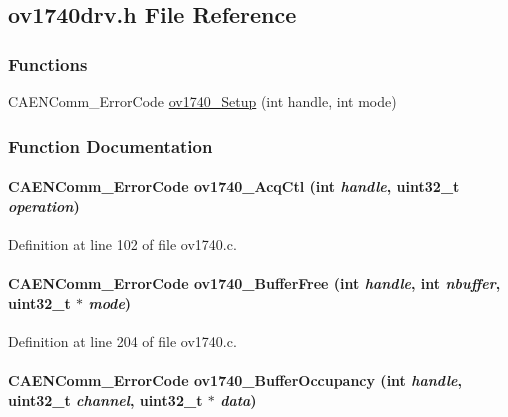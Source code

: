 \subsection{ov1740drv.h File Reference}
\label{ov1740drv_8h}
\subsubsection*{Functions}
\begin{DoxyCompactItemize}
\item 
CAENComm\_\-ErrorCode \hyperlink{ov1740drv_8h_a37458e8b4bbc712076b0b1e15c5241e9}{ov1740\_\-Setup} (int handle, int mode)
\end{DoxyCompactItemize}


\subsubsection{Function Documentation}
\paragraph[{ov1740\_\-AcqCtl}]{\setlength{\rightskip}{0pt plus 5cm}CAENComm\_\-ErrorCode ov1740\_\-AcqCtl (int {\em handle}, \/  uint32\_\-t {\em operation})}\hfill\label{ov1740drv_8h_a9f50f40f2578ebea2eff57a82a172ac8}


Definition at line 102 of file ov1740.c.
\paragraph[{ov1740\_\-BufferFree}]{\setlength{\rightskip}{0pt plus 5cm}CAENComm\_\-ErrorCode ov1740\_\-BufferFree (int {\em handle}, \/  int {\em nbuffer}, \/  uint32\_\-t $\ast$ {\em mode})}\hfill\label{ov1740drv_8h_a82abc70f4cc7d36c226d4c041f152de3}


Definition at line 204 of file ov1740.c.
\paragraph[{ov1740\_\-BufferOccupancy}]{\setlength{\rightskip}{0pt plus 5cm}CAENComm\_\-ErrorCode ov1740\_\-BufferOccupancy (int {\em handle}, \/  uint32\_\-t {\em channel}, \/  uint32\_\-t $\ast$ {\em data})}\hfill\label{ov1740drv_8h_a4b3f7a80a817dfdcaf612ebb946f7844}


